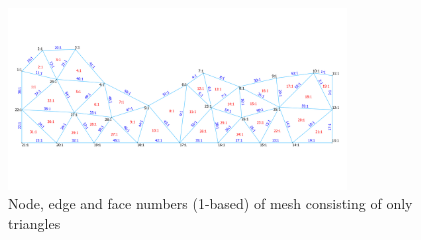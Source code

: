 \documentclass[biblatex]{deltares_memo}
\begin{document}
\begin{figure}[H]
	\centering
	\includegraphics[width=0.8\textwidth]{pictures/all_numbers_triangles.png}
	\caption{Node, edge and face numbers (1-based) of mesh consisting of only triangles}
\end{figure}
\end{document}
